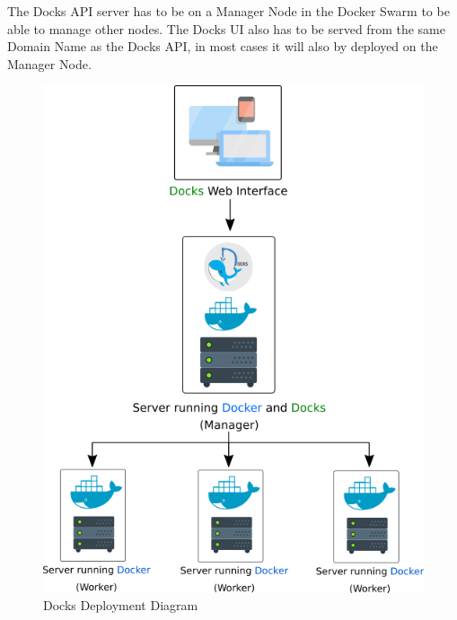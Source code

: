 \documentclass[]{article}
\begin{document}
The Docks API server has to be on a Manager Node in the Docker Swarm to be able to manage other nodes. The Docks UI also has to be served from the same Domain Name as the Docks API, in most cases it will also by deployed on the Manager Node.

\begin{figure}[h!]
	\centering
	\includegraphics[scale=0.8]{deployment_diagram.png}
	\caption{Docks Deployment Diagram}
\end{figure}

\pagebreak
\end{document}
